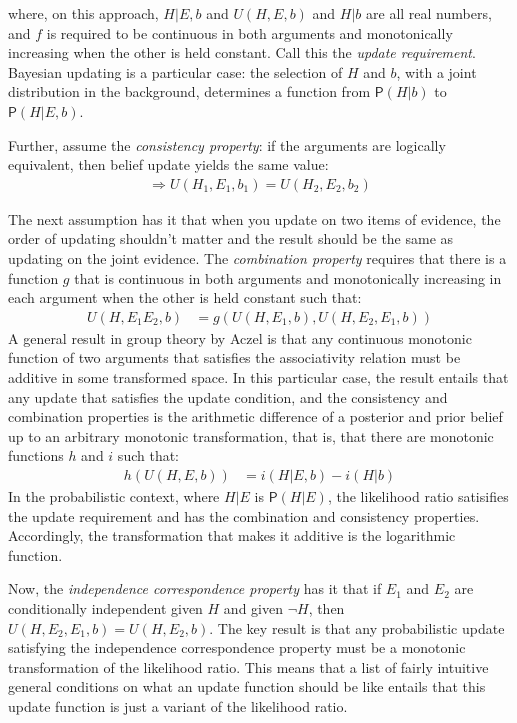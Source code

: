 \documentclass[
  letterpaper,
  DIV=11,
  numbers=noendperiod]{scrartcl}
\newcommand{\n}{\neg}
\newcommand{\pr}[1]{\mathsf{P}(#1)}
\begin{document}
\noindent where, on this approach, \(H \vert E, b\) and \(U(H,E,b)\) and
\(H \vert b\) are all real numbers, and \(f\) is required to be
continuous in both arguments and monotonically increasing when the other
is held constant. Call this the \textit{update requirement}. Bayesian
updating is a particular case: the selection of \(H\) and \(b\), with a
joint distribution in the background, determines a function from
\(\pr{H \vert b}\) to \(\pr{H \vert E, b}\).

Further, assume the \textit{consistency property}: if the arguments are
logically equivalent, then belief update yields the same value:
\begin{align*}
[H_1 \Leftrightarrow H_2, E_1 \Leftrightarrow E_2] \Rightarrow U(H_1, E_1, b_1) = U(H_2, E_2, b_2)
\end{align*}

\noindent The next assumption has it that when you update on two items
of evidence, the order of updating shouldn't matter and the result
should be the same as updating on the joint evidence. The
\textit{combination property} requires that there is a function \(g\)
that is continuous in both arguments and monotonically increasing in
each argument when the other is held constant such that: \begin{align*}
U(H, E_1E_2,b) & =  g(U(H,E_1, b), U(H, E_2, E_1, b))
\end{align*} A general result in group theory by Aczel is that any
continuous monotonic function of two arguments that satisfies the
associativity relation must be additive in some transformed space. In
this particular case, the result entails that any update that satisfies
the update condition, and the consistency and combination properties is
the arithmetic difference of a posterior and prior belief up to an
arbitrary monotonic transformation, that is, that there are monotonic
functions \(h\) and \(i\) such that: \begin{align*}
h(U(H,E,b)) & = i(H\vert E, b) - i(H\vert b)
\end{align*} In the probabilistic context, where \(H\vert E\) is
\(\pr{H\vert E}\), the likelihood ratio satisifies the update
requirement and has the combination and consistency properties.
Accordingly, the transformation that makes it additive is the
logarithmic function.

Now, the \emph{independence correspondence property} has it that if
\(E_1\) and \(E_2\) are conditionally independent given \(H\) and given
\(\n H\), then \(U(H, E_2, E_1, b) = U(H, E_2, b)\). The key result is
that any probabilistic update satisfying the independence correspondence
property must be a monotonic transformation of the likelihood ratio.
This means that a list of fairly intuitive general conditions on what an
update function should be like entails that this update function is just
a variant of the likelihood ratio.
\end{document}
